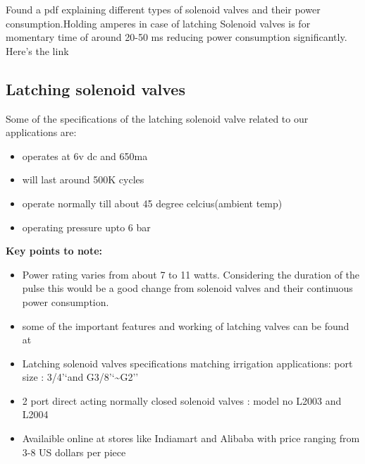 \documentclass[16pt]{article}
\begin{document}
\vspace{0.3cm}

  Found a pdf explaining different types of solenoid valves and their
  power consumption.Holding amperes in case of latching Solenoid valves is
  for momentary time of around 20-50 ms reducing power consumption
  significantly. Here's the link %

\vspace{0.3cm}

\subsection{Latching solenoid valves}

  Some of the specifications of the latching solenoid valve related to our
  applications are:
  
  \begin{itemize}

  \item
    operates at 6v dc and 650ma
  \item
    will last around 500K cycles
  \item
    operate normally till about 45 degree celcius(ambient temp)
  \item
    operating pressure upto 6 bar
  \end{itemize}
 

  \textbf{Key points to note:}

  \begin{itemize}

  \item
    Power rating varies from about 7 to 11 watts. Considering the duration
    of the pulse this would be a good change from solenoid valves and
    their continuous power consumption.
  \item
    some of the important features and working of latching valves can be
    found at
    
  \item
    Latching solenoid valves specifications matching irrigation
    applications: port size : 3/4'`and G3/8'`\textasciitilde{}G2''
  \item
    2 port direct acting normally closed solenoid valves : model no L2003
    and L2004
  \item
    Availaible online at stores like Indiamart and Alibaba with price
    ranging from 3-8 US dollars per piece
  \end{itemize}
  
\end{document}
